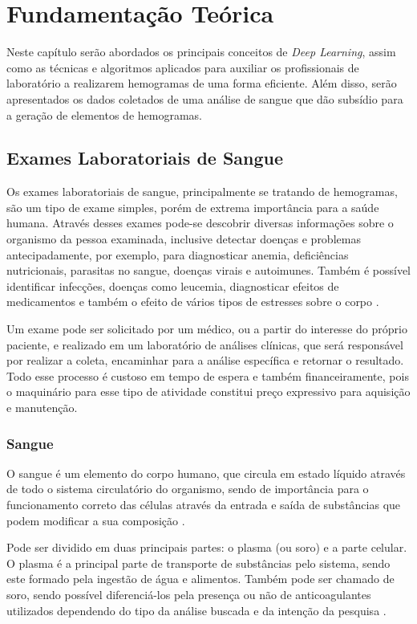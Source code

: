 \chapter{Fundamentação Teórica}
\label{chap:fund}

Neste capítulo serão abordados os principais conceitos de \emph{Deep Learning}, assim como as técnicas e algoritmos aplicados para auxiliar os profissionais de laboratório a realizarem hemogramas de uma forma eficiente. Além disso, serão apresentados os dados coletados de uma análise de sangue que dão subsídio para a geração de elementos de hemogramas.

\section{Exames Laboratoriais de Sangue}
\label{sec:conceito1}
Os exames laboratoriais de sangue, principalmente se tratando de hemogramas, são um tipo de exame simples, porém de extrema importância para a saúde humana. Através desses exames pode-se descobrir diversas informações sobre o organismo da pessoa examinada, inclusive detectar doenças e problemas antecipadamente, por exemplo, para diagnosticar anemia, deficiências nutricionais, parasitas no sangue, doenças virais e autoimunes. Também é possível identificar infecções, doenças como leucemia, diagnosticar efeitos de medicamentos e também o efeito de vários tipos de estresses sobre o corpo \cite{abcOfCbc, atlasDeHematologiaEAnalise}.

Um exame pode ser solicitado por um médico, ou a partir do interesse do próprio paciente, e realizado em um laboratório de análises clínicas, que será responsável por realizar a coleta, encaminhar para a análise específica e retornar o resultado. Todo esse processo é custoso em tempo de espera e também financeiramente, pois o maquinário para esse tipo de atividade constitui preço expressivo para aquisição e manutenção.

\subsection{Sangue}
O sangue é um elemento do corpo humano, que circula em estado líquido através de todo o sistema circulatório do organismo, sendo de importância para o funcionamento correto das células através da entrada e saída de substâncias que podem modificar a sua composição \cite{manualHematologia}.

Pode ser dividido em duas principais partes: o plasma (ou soro) e a parte celular. O plasma é a principal parte de transporte de substâncias pelo sistema, sendo este formado pela ingestão de água e alimentos. Também pode ser chamado de soro, sendo possível diferenciá-los pela presença ou não de anticoagulantes utilizados dependendo do tipo da análise buscada e da intenção da pesquisa \cite{interpretacaoHemograma}.

